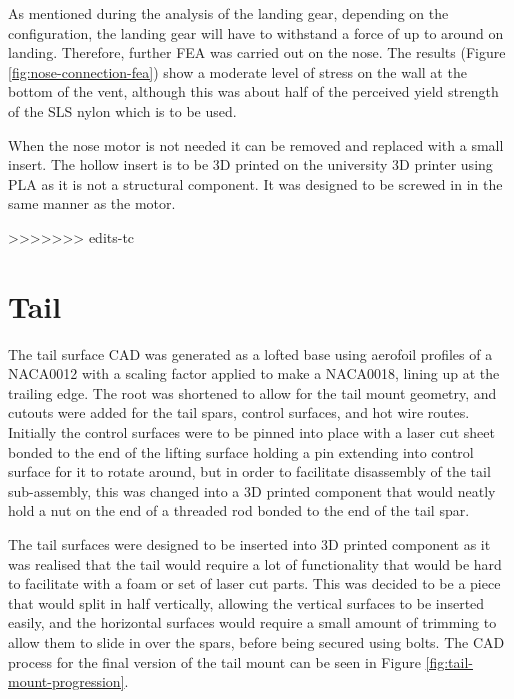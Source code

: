 \documentclass[../../main.tex]{subfiles}
\begin{document}
As mentioned during the analysis of the landing gear, depending on the configuration, the landing gear will have to withstand a force of up to around  on landing.
Therefore, further FEA was carried out on the nose.
The results (Figure \ref{fig:nose-connection-fea}) show a moderate level of stress on the wall at the bottom of the vent, although this was about half of the perceived yield strength of the SLS nylon which is to be used. 


When the nose motor is not needed it can be removed and replaced with a small insert.
The hollow insert is to be 3D printed on the university 3D printer using PLA as it is not a structural component.
It was designed to be screwed in in the same manner as the motor. 


>>>>>>> edits-tc
\section{Tail} \label{sec:final-design-proposal:tail}


The tail surface CAD was generated as a lofted base using aerofoil profiles of a NACA0012 with a scaling factor applied to make a NACA0018, lining up at the trailing edge.
The root was shortened to allow for the tail mount geometry, and cutouts were added for the tail spars, control surfaces, and hot wire routes.
Initially the control surfaces were to be pinned into place with a laser cut sheet bonded to the end of the lifting surface holding a pin extending into control surface for it to rotate around, but in order to facilitate disassembly of the tail sub-assembly, this was changed into a 3D printed component that would neatly hold a nut on the end of a threaded rod bonded to the end of the tail spar.

The tail surfaces were designed to be inserted into 3D printed component as it was realised that the tail would require a lot of functionality that would be hard to facilitate with a foam or set of laser cut parts.
This was decided to be a piece that would split in half vertically, allowing the vertical surfaces to be inserted easily, and the horizontal surfaces would require a small amount of trimming to allow them to slide in over the spars, before being secured using bolts.
The CAD process for the final version of the tail mount can be seen in Figure \ref{fig:tail-mount-progression}.
\end{document}
